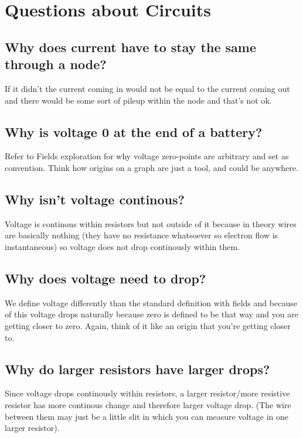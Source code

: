 \documentclass[letterpaper]{article}
\begin{document}
\section{Questions about Circuits}
\label{sec:org977bd02}
\subsection{Why does current have to stay the same through a node?}
\label{sec:orgbe4a012}
If it didn't the current coming in would not be equal to the current coming out and there would be some sort of pileup within the node and that's not ok.
\subsection{Why is voltage 0 at the end of a battery?}
\label{sec:org1e7794e}
Refer to Fields exploration for why voltage zero-points are arbitrary and set as convention. Think how origins on a graph are just a tool, and could be anywhere.
\subsection{Why isn't voltage continous?}
\label{sec:org43da5c7}
Voltage is continous within resistors but not outside of it because in theory wires are basically nothing (they have no resistance whatsoever so electron flow is instantaneous) so voltage does not drop continously within them.
\subsection{Why does voltage need to drop?}
\label{sec:orgf278373}
We define voltage differently than the standard definition with fields and because of this voltage drops naturally because zero is defined to be that way and you are getting closer to zero. Again, think of it like an origin that you're getting closer to.
\subsection{Why do larger resistors have larger drops?}
\label{sec:orgab4378c}
Since voltage drops continously within resistors, a larger resistor/more resistive resistor has more continous change and therefore larger voltage drop. (The wire between them may just be a little slit in which you can measure voltage in one larger resistor).
\end{document}
